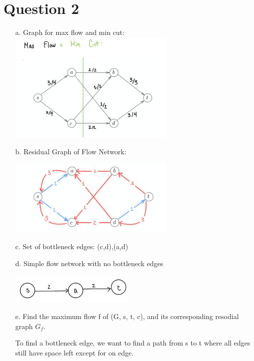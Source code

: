 \documentclass[12pt]{article}
\begin{document}
\section*{Question 2}
\begin{enumerate}
    \item[a.] Graph for max flow and min cut:\\
        
        \includegraphics[width=8cm]{Graphs/2A.png}

    \item[b.]  Residual Graph of Flow Network:

        \includegraphics[width=8cm]{Graphs/2B.png}

    \item[c. ]Set of bottleneck edges: {(c,d),(a,d)}
    \item[d. ] Simple flow network with no bottleneck edges
    
        \includegraphics[width=6cm]{Graphs/2C.png}

    \item[e. ] Find the maximum flow f of (G, s, t, c), and its corresponding resodial
               graph $G_{f}$.
               
               To find a bottleneck edge, we want to find a path from s to t where all edges still
               have space left except for on edge. 
               


\end{enumerate}
\end{document}
